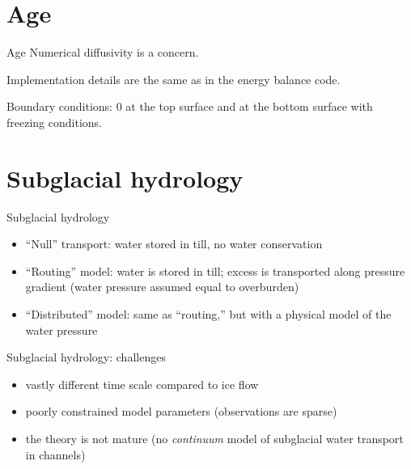 \documentclass[hide notes,intlimits]{beamer}
\begin{document}

\section{Age}
\label{sec:age}

\begin{frame}{Age}
  Numerical diffusivity is a concern.

  Implementation details are the same as in the energy balance code.

  Boundary conditions: 0 at the top surface and at the bottom surface
  with freezing conditions.
\end{frame}

\section{Subglacial hydrology}
\label{sec:subglacial-hydrology}

\begin{frame}{Subglacial hydrology}

  \begin{itemize}
  \item ``Null'' transport: water stored in till, no water conservation
  \item ``Routing'' model: water is stored in till; excess is
    transported along pressure gradient (water pressure assumed equal
    to overburden)
  \item ``Distributed'' model: same as ``routing,'' but with a
    physical model of the water pressure
  \end{itemize}
\end{frame}

\begin{frame}{Subglacial hydrology: challenges}
  \begin{itemize}
  \item vastly different time scale compared to ice flow
  \item poorly constrained model parameters (observations are sparse)
  \item the theory is not mature (no \emph{continuum} model of
    subglacial water transport in channels)
  \end{itemize}
\end{frame}

\end{document}
